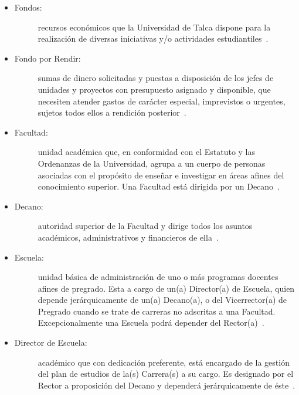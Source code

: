\begin{itemize}
	\item 	\begin{description}
			    \item[Fondos:] recursos  económicos  que  la  Universidad  de  Talca  dispone  para  la  realización  de diversas iniciativas y/o actividades estudiantiles~\cite{1}.
			\end{description}

	\item 	\begin{description}
			    \item[Fondo por Rendir:] sumas de dinero solicitadas y puestas a disposición de los jefes de unidades y proyectos con presupuesto asignado y disponible, que necesiten atender gastos de carácter especial, imprevistos o urgentes, sujetos todos ellos a rendición posterior~\cite{1}.
			\end{description}

	\item 	\begin{description}
			    \item[Facultad:] unidad académica que, en conformidad con el Estatuto y las Ordenanzas de la Universidad, agrupa a un cuerpo de personas asociadas con el propósito de enseñar e investigar en áreas afines del conocimiento superior. Una Facultad está dirigida por un Decano~\cite{1}.
			\end{description}

	\item 	\begin{description}
			    \item[Decano:] autoridad superior de la Facultad y dirige todos los asuntos académicos, administrativos y financieros de ella~\cite{1}.
			\end{description}

	\item 	\begin{description}
			    \item[Escuela:] unidad básica de administración de uno o más programas docentes afines de pregrado. Esta a cargo de un(a) Director(a) de Escuela, quien depende jerárquicamente de un(a) Decano(a), o del Vicerrector(a) de Pregrado cuando se trate de carreras no adscritas a una Facultad. Excepcionalmente una Escuela podrá depender del Rector(a)~\cite{1}.
			\end{description}

	\item 	\begin{description}
				\item[Director de Escuela:] académico que con dedicación preferente, está encargado de la gestión del plan de estudios de la(s) Carrera(s) a su cargo. Es designado por el Rector a proposición del Decano y dependerá jerárquicamente de éste~\cite{1}.			\end{description}


\end{itemize}
